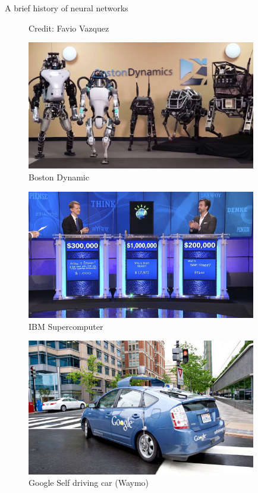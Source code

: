 \begin{vbframe}{A brief history of neural networks}
\begin{figure}
      \caption{Credit: Favio Vazquez}
  \end{figure}
  \framebreak
 \begin{figure}
    \centering
    \includegraphics[width=10cm]{plots/bostondynamic.png}
    \caption{Boston Dynamic}
 \end{figure}
  \begin{figure}
    \centering
    \includegraphics[width=10cm]{plots/ibmsupercomputer.jpg}
    \caption{IBM Supercomputer}
 \end{figure}
  \begin{figure}
    \centering
    \includegraphics[width=10cm]{plots/selfdriving.jpg}
    \caption{Google Self driving car (Waymo)}
 \end{figure}
\end{vbframe}

\endlecture
